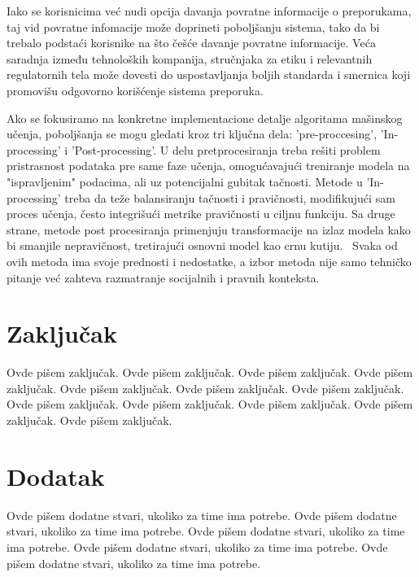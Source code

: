 \documentclass[a4paper]{article}
\begin{document}
Iako se korisnicima već nudi opcija davanja povratne informacije o preporukama, taj vid povratne infomacije može doprineti poboljšanju sistema, tako da bi trebalo podstaći korisnike na što češće davanje povratne informacije.
Veća saradnja između tehnoloških kompanija, stručnjaka za etiku i relevantnih regulatornih tela može dovesti do uspostavljanja boljih standarda i smernica koji promovišu odgovorno korišćenje sistema preporuka.

Ako se fokusiramo na konkretne implementacione detalje algoritama mašinskog učenja, poboljšanja se mogu gledati kroz tri ključna dela: 'pre-proccesing', 'In-processing' i 'Post-processing'. U delu pretprocesiranja treba rešiti problem pristrasnost podataka pre same faze učenja, omogućavajući treniranje modela na "ispravljenim" podacima, ali uz potencijalni gubitak tačnosti. Metode u 'In-processing' treba da teže balansiranju tačnosti i pravičnosti, modifikujući sam proces učenja, često integrišući metrike pravičnosti u ciljnu funkciju. Sa druge strane, metode post procesiranja primenjuju transformacije na izlaz modela kako bi smanjile nepravičnost, tretirajući osnovni model kao crnu kutiju.~\cite{fairness}  Svaka od ovih metoda ima svoje prednosti i nedostatke, a izbor metoda nije samo tehničko pitanje već zahteva razmatranje socijalnih i pravnih konteksta. 


\section{Zaključak}
\label{sec:zakljucak}

Ovde pišem zaključak. 
Ovde pišem zaključak. 
Ovde pišem zaključak. 
Ovde pišem zaključak. 
Ovde pišem zaključak. 
Ovde pišem zaključak. 
Ovde pišem zaključak. 
Ovde pišem zaključak. 
Ovde pišem zaključak. 
Ovde pišem zaključak. 
Ovde pišem zaključak. 
Ovde pišem zaključak. 


\appendix
 


\appendix
\section{Dodatak}
Ovde pišem dodatne stvari, ukoliko za time ima potrebe.
Ovde pišem dodatne stvari, ukoliko za time ima potrebe.
Ovde pišem dodatne stvari, ukoliko za time ima potrebe.
Ovde pišem dodatne stvari, ukoliko za time ima potrebe.
Ovde pišem dodatne stvari, ukoliko za time ima potrebe.
\end{document}
